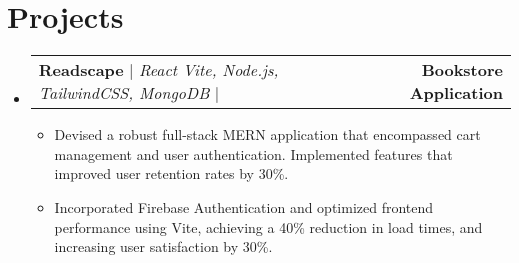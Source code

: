 \documentclass[letterpaper,11pt]{article}
\makeatletter
\newcommand{\resumeSubheading}[4]{
  \vspace{-5pt}\item
    \begin{tabular*}{1.0\textwidth}[t]{l@{\extracolsep{\fill}}r}
      \textbf{#1} & \textbf{\small #2} \\
      \textit{\small#3} & \textit{\small #4} \\
    \end{tabular*}\vspace{-5pt}
}
\newcommand{\resumeProjectHeading}[2]{
    \item
    \begin{tabular*}{1.001\textwidth}{l@{\extracolsep{\fill}}r}
      \small#1 & \textbf{\small #2}\\
    \end{tabular*}\vspace{-7pt}
}
\newcommand{\resumeSubHeadingListStart}{\begin{itemize}[leftmargin=0.0in, label={}]}
\newcommand{\resumeSubHeadingListEnd}{\end{itemize}}
\newcommand{\resumeItemListStart}{\begin{itemize}}
\newcommand{\resumeItemListEnd}{\end{itemize}\vspace{-15pt}}
\makeatother
\begin{document}

\section{Projects}
    \vspace{-4pt}
    \resumeSubHeadingListStart
        \resumeProjectHeading
          {\textbf{\large Readscape} $|$ \emph{React Vite, Node.js, TailwindCSS, MongoDB} $|$ \emph{\color{Blue} \href{https://readscape-sigma.vercel.app/}\faGlobe{} \href{https://github.com/sanghaibiraj/readscape}\faGithub{}}}{Bookstore Application}
          \vspace{-16pt}
          \resumeItemListStart
            \item Devised a robust full-stack MERN application that encompassed cart management and user authentication. Implemented features that improved user retention rates by 30\%. 
            \vspace{-4pt}
            \item Incorporated Firebase Authentication and optimized frontend performance using Vite, achieving a 40\% reduction in load times, and increasing user satisfaction by 30\%.
          \resumeItemListEnd
        \vspace{-10pt}
    \resumeSubHeadingListEnd
\end{document}
